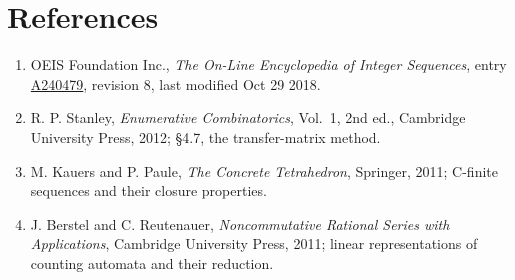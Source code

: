 \documentclass[11pt]{article}
\theoremstyle{definition}
\begin{document}
\section{References}

\begin{enumerate}

\item OEIS Foundation Inc., \emph{The On-Line Encyclopedia of Integer Sequences}, entry \href{https://oeis.org/A240479}{A240479}, revision 8, last modified Oct 29 2018.

\item R. P. Stanley, \emph{Enumerative Combinatorics}, Vol.~1, 2nd ed., Cambridge University Press, 2012; \S4.7, the transfer-matrix method.

\item M. Kauers and P. Paule, \emph{The Concrete Tetrahedron}, Springer, 2011; C-finite sequences and their closure properties.

\item J. Berstel and C. Reutenauer, \emph{Noncommutative Rational Series with Applications}, Cambridge University Press, 2011; linear representations of counting automata and their reduction.

\end{enumerate}
\end{document}
